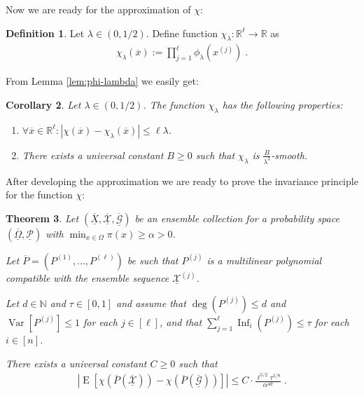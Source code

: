 \documentclass{daj}
\newcommand{\1}{\mathbbm{1}}
\theoremstyle{plain}
\newtheorem{theorem}{Theorem}[section]
\newtheorem{corollary}[theorem]{Corollary}
\theoremstyle{definition}
\newtheorem{definition}[theorem]{Definition}
\DeclareMathOperator*{\EE}{E}
\DeclareMathOperator*{\Var}{Var}
\DeclareMathOperator{\Inf}{Inf}
\begin{document}
Now we are ready for the approximation of $\chi$:
\begin{definition}
  Let $\lambda \in (0, 1/2)$. Define function
  $\chi_\lambda: \mathbb{R}^\ell \to \mathbb{R}$ as
\begin{align*}
	\chi_\lambda(\overline{x}) := \prod_{j=1}^\ell \phi_\lambda(x^{(j)}) \; .
\end{align*}
\end{definition}

From Lemma \ref{lem:phi-lambda} we easily get:
\begin{corollary}
\label{cor:xi}
Let $\lambda \in (0, 1/2)$. The function $\chi_\lambda$ has the following
properties:
\begin{enumerate}[1)]
\item
  $\forall \overline{x} \in \mathbb{R}^\ell: \left| \chi(\overline{x}) -
    \chi_\lambda(\overline{x}) \right| \le \ell \lambda$.
\item There exists a universal constant $B \ge 0$ such that $\chi_\lambda$ is
$\frac{B}{\lambda^3}$-smooth.
\end{enumerate}
\end{corollary}

After developing the approximation we are ready to prove the invariance
principle for the function $\chi$:

\begin{theorem}
\label{thm:invariance-xi}
Let $(\overline{\underline{X}}, 
\overline{\underline{\mathcal{X}}},
\overline{\underline{\mathcal{G}}})$ be an ensemble collection
for a probability space 
$(\overline{\underline{\Omega}}, \underline{\mathcal{P}})$
with $\min_{x \in \Omega} \pi(x) \ge \alpha > 0$.

Let $\overline{P} = (P^{(1)}, \ldots, P^{(\ell)})$ be
such that $P^{(j)}$ is a multilinear polynomial compatible with 
the ensemble sequence $\underline{\mathcal{X}}^{(j)}$.

Let $d \in \mathbb{N}$ and $\tau \in [0, 1]$ and assume that
$\deg(P^{(j)}) \le d$ and $\Var[P^{(j)}] \le 1$ for each $j \in [\ell]$, 
and that $\sum_{j=1}^\ell \Inf_i(P^{(j)}) \le \tau$ for each $i \in [n]$.

There exists a universal constant $C \ge 0$ such that
\begin{align*}
  \left| \EE \left[ 
  \chi(\overline{P}(\overline{\underline{\mathcal{X}}}))
  -\chi(\overline{P}(\overline{\underline{\mathcal{G}}}))
  \right] \right|
  \le
  C \cdot \frac{\ell^{5/2} \tau^{1/8}}{\alpha^{4d}} \; .
\end{align*}
\end{theorem}
\end{document}
